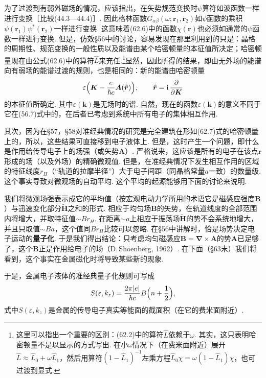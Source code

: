 为了过渡到有弱外磁场的情况，应该指出，在矢势规范变换时$\psi$算符如波函数一样进行变换［比较(44.3—44.4)］. 因此格林函数$G_{\alpha\beta}(\omega;\bm{r}_1,\bm{r}_2)$如$\psi$函数的乘积$\psi(\bm{r}_1)\psi^*(\bm{r}_2)$一样进行变换. 这意味着(62.6)中的函数$\chi(\bm{r})$也必须如通常的$\psi$函数一样进行变换. 但是，仿效§56中的讨论，容易发现在那里利用到的只是：晶格的周期性、规范变换的一般性质以及能谱由某个哈密顿量的本征值所决定；哈密顿量现在由公式(62.6)中的算符$\hat{L}$来充任.\footnote{这里可以指出一个重要的区别：(62.2)中的算符$\hat{L}$依赖于$\omega$. 其实，这只表明哈密顿量不是以显示的方式写出. 在小$\omega$情况下（在费米面附近）展开$\hat{L}\approx\hat{L}_0+\omega\hat{L}_1$，然后用算符$(1-\hat{L}_1)^{-1}$左乘方程$\hat{L}_0\chi=\omega(1-\hat{L}_1)\chi$，也可过渡到显式.}显然，因此所得的结果，即由无外场的能谱向有弱场的能谱过渡的规则，也是相同的：新的能谱由哈密顿量
\begin{equation}
\varepsilon\Bigl(\bm{K}-\frac{e}{\hbar c}\bm{A}(\hat{\bm{r}})\Bigr),
\qquad \hat{\bm{r}}=\mathrm{i}\,\frac{\partial}{\partial\bm{K}}
\end{equation}
的本征值所确定. 其中$\varepsilon(\bm{k})$是无场时的谱. 自然，现在的函数$\varepsilon(\bm{k})$的意义不同于它在(56.7)式中的，在后者已考虑到系统中所有电子的集体相互作用.

其次，因为在§57，§58对准经典情况的研究是完全建筑在形如(62.7)式的哈密顿量上的，所以，这些结果可直接移到电子液体上. 但是，这时产生一个问题，即什么是作用给传导电子上的场强（或矢势$\bm{A}$）. 严格说来，这应该是所有的电子在该点$\bm{r}$形成的场（以及外场）的精确微观值. 但是，在准经典情况下发生相互作用的区域的特征线度$r_H$（“轨道的拉摩半径”）大于电子间距（同晶格常量$a$一致）的数量级. 这个事实导致对微观场的自动平均. 这个平均的起源能够用下面的讨论来说明.

我们将微观场强表示成它的平均值（按宏观电动力学所用的术语它是磁感应强度$\bm{B}$）与迅速变化部分$\widetilde{\bm{H}}$之和的形式. 相应于均匀场$\bm{B}$的矢势，在轨道线度的全部范围内将增大，并取特征值$\sim B r_H$. 在距离$\sim a$上相应于振荡场$\widetilde{\bm{H}}$的势不会系统地增大，并且只取值$\sim Ba$，这个值同$Br_H$比较可以忽略. 在§56中讲解时，恰是场势决定电子运动的\textbf{量子化}. 于是我们得出结论：只考虑均匀磁感应$\bm{B}=\bm{\nabla}\times\bm{A}$的势$\bm{A}$已足够了，这个$\bm{B}$正是作用给电子的场（D.\,Shoenberg, 1962）. 在下面（§63末）我们将看到，这个事实在金属磁化时将导致某些新的现象.

于是，金属电子液体的准经典量子化规则可写成
\begin{equation}
S(\varepsilon,k_z)=\frac{2\pi|e|}{\hbar c}B\Bigl(n+\frac{1}{2}\Bigr),
\end{equation}
式中$S(\varepsilon,k_z)$是金属的传导电子真实等能面的截面积（在它的费米面附近）.

